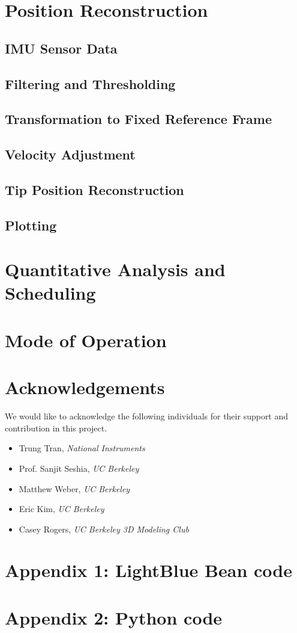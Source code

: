 \documentclass[12pt,journal]{IEEEtran}
\begin{document}
\section{Position Reconstruction}
\subsection{IMU Sensor Data}
\subsection{Filtering and Thresholding}
\subsection{Transformation to Fixed Reference Frame}
\subsection{Velocity Adjustment}
\subsection{Tip Position Reconstruction}
\subsection{Plotting}

\section{Quantitative Analysis and Scheduling}

\section{Mode of Operation}

\section{Acknowledgements}
We would like to acknowledge the following individuals for their support and contribution in this project.
\begin{itemize}
\item Trung Tran, \textit{National Instruments}
\item Prof. Sanjit Seshia, \textit{UC Berkeley}
\item Matthew Weber, \textit{UC Berkeley}
\item Eric Kim, \textit{UC Berkeley}
\item Casey Rogers, \textit{UC Berkeley 3D Modeling Club}
\end{itemize}

\newpage
\onecolumn

\section{Appendix 1: LightBlue Bean code}
\small{

}

\section{Appendix 2: Python code}
\small{

}
\end{document}
